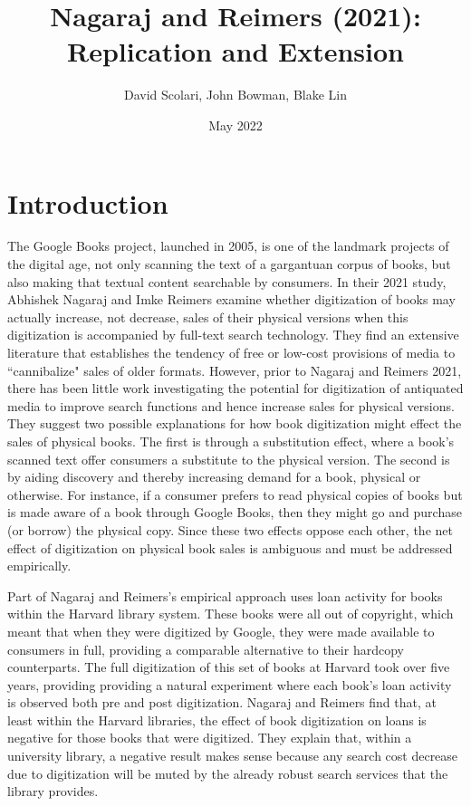\documentclass{article}
\author{David Scolari, John Bowman, Blake Lin}
\title{Nagaraj and Reimers (2021): Replication and Extension}
\date{May 2022}
\begin{document}
\maketitle

\begin{abstract}
\end{abstract}

\section{Introduction}
The Google Books project, launched in 2005, is one of the landmark projects of the digital age, not only scanning the text of a gargantuan corpus of books, but also making that textual content searchable by consumers. In their 2021 study, Abhishek Nagaraj and Imke Reimers examine whether digitization of books may actually increase, not decrease, sales of their physical versions when this digitization is accompanied by full-text search technology. They find an extensive literature that establishes the tendency of free or low-cost provisions of media to ``cannibalize" sales of older formats. However, prior to Nagaraj and Reimers 2021, there has been little work investigating the potential for digitization of antiquated media to improve search functions and hence increase sales for physical versions. They suggest two possible explanations for how book digitization might effect the sales of physical books. The first is through a substitution effect, where a book's scanned text offer consumers a substitute to the physical version. The second is by aiding discovery and thereby increasing demand for a book, physical or otherwise. For instance, if a consumer prefers to read physical copies of books but is made aware of a book through Google Books, then they might go and purchase (or borrow) the physical copy. Since these two effects oppose each other, the net effect of digitization on physical book sales is ambiguous and must be addressed empirically.

Part of Nagaraj and Reimers's empirical approach uses loan activity for books within the Harvard library system. These books were all out of copyright, which meant that when they were digitized by Google, they were made available to consumers in full, providing a comparable alternative to their hardcopy counterparts. The full digitization of this set of books at Harvard took over five years, providing providing a natural experiment where each book's loan activity is observed both pre and post digitization. Nagaraj and Reimers find that, at least within the Harvard libraries, the effect of book digitization on loans is negative for those books that were digitized. They explain that, within a university library, a negative result makes sense because any search cost decrease due to digitization will be muted by the already robust search services that the library provides. 
\end{document}
